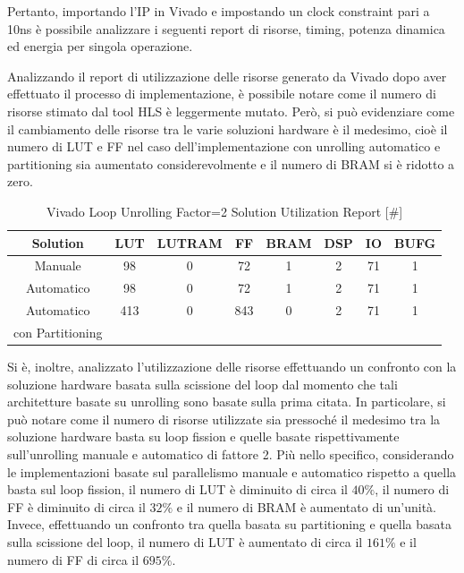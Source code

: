 Pertanto, importando l'IP in Vivado e impostando un clock constraint pari a 10ns è possibile analizzare i seguenti report di risorse, timing, potenza dinamica ed energia per singola operazione.


Analizzando il report di utilizzazione delle risorse generato da Vivado dopo aver effettuato il processo di implementazione, è possibile notare come il numero di risorse stimato dal tool HLS è leggermente mutato. Però, si può evidenziare come il cambiamento delle risorse tra le varie soluzioni hardware è il medesimo, cioè il numero di LUT e FF nel caso dell'implementazione con unrolling automatico e partitioning sia aumentato considerevolmente e il numero di BRAM si è ridotto a zero.

\begin{table}[H]
    \centering
    \begin{tabular}{|c|c|c|c|c|c|c|c|}
        \hline
        \textbf{Solution} & \textbf{LUT} & \textbf{LUTRAM} & \textbf{FF} & \textbf{BRAM} & \textbf{DSP} & \textbf{IO} & \textbf{BUFG} \\
        \hline
        Manuale & 98 & 0 & 72 & 1 & 2 & 71 & 1 \\
        \hline
        Automatico & 98 & 0 & 72 & 1 & 2 & 71 & 1 \\
        \hline
        Automatico & 413 & 0 & 843 & 0 & 2 & 71 & 1 \\
        con Partitioning & & & & & & & \\
        \hline
    \end{tabular}
    \caption{Vivado Loop Unrolling Factor=2 Solution Utilization Report [\#]}
    \label{tab:vivado-loop-unrolling-factor2-utilization-report}
\end{table}

Si è, inoltre, analizzato l'utilizzazione delle risorse effettuando un confronto con la soluzione hardware basata sulla scissione del loop dal momento che tali architetture basate su unrolling sono basate sulla prima citata. In particolare, si può notare come il numero di risorse utilizzate sia pressoché il medesimo tra la soluzione hardware basta su loop fission e quelle basate rispettivamente sull'unrolling manuale e automatico di fattore 2. Più nello specifico, considerando le implementazioni basate sul parallelismo manuale e automatico rispetto a quella basta sul loop fission, il numero di LUT è diminuito di circa il $40\%$, il numero di FF è diminuito di circa il $32\%$ e il numero di BRAM è aumentato di un'unità. Invece, effettuando un confronto tra quella basata su partitioning e quella basata sulla scissione del loop, il numero di LUT è aumentato di circa il $161\%$ e il numero di FF di circa il $695\%$.

